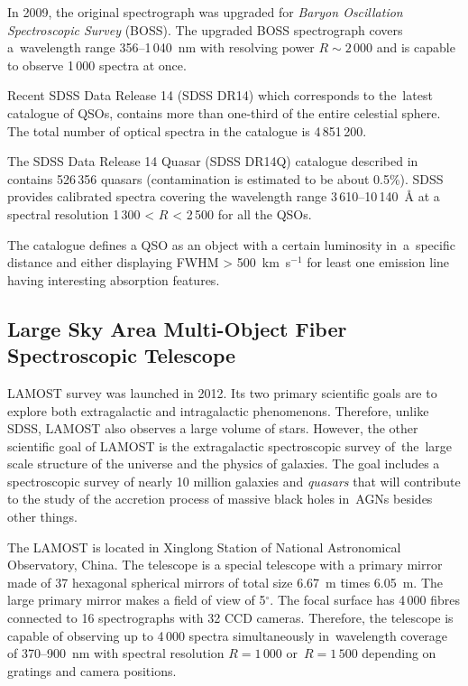 In 2009, the original spectrograph was upgraded for \textit{Baryon Oscillation Spectroscopic Survey} (BOSS).
The upgraded BOSS spectrograph covers a~wavelength range 356--1\,040~nm
with resolving power \(R \sim 2\,000\)
and is capable to observe 1\,000 spectra at once.~\cite{smee2013}

Recent SDSS Data Release 14 (SDSS DR14) which corresponds to the~latest catalogue of QSOs,
contains more than one-third of the entire celestial sphere.
The total number of optical spectra in the catalogue is 4\,851\,200.

The SDSS Data Release 14 Quasar (SDSS DR14Q) catalogue described in~\cite{paris2018} contains 526\,356 quasars
(contamination is estimated to be about 0.5\%).
SDSS provides calibrated spectra covering the wavelength range 3\,610--10\,140~\AA{} at a spectral resolution 1\,300 < \(R\) < 2\,500 for all the QSOs.

The catalogue defines a QSO as an object with a certain luminosity in~a~specific distance
and either displaying FWHM > 500~km~s\(^{-1}\) for least one emission line having interesting absorption features.

\subsection{Large Sky Area Multi-Object Fiber Spectroscopic Telescope}
\label{lamost}

LAMOST survey was launched in 2012.
Its two primary scientific goals are to explore both extragalactic and intragalactic phenomenons.
Therefore, unlike SDSS, LAMOST also observes a large volume of stars.
However, the other scientific goal of LAMOST is the extragalactic spectroscopic survey of~the~large scale structure of the universe and the physics of galaxies.
The goal includes a spectroscopic survey of nearly 10 million galaxies and \textit{quasars}
that will contribute to the study of the accretion process of massive black holes in~AGNs besides other things.~\cite{cui2012}

The LAMOST is located in Xinglong Station of National Astronomical Observatory, China.
The telescope is a special telescope with a primary mirror made of 37 hexagonal spherical mirrors of total size 6.67~m times 6.05~m.
The large primary mirror makes a field of view of 5\(^{\circ}\).
The focal surface has 4\,000 fibres connected to 16 spectrographs with 32 CCD cameras.
Therefore, the telescope is capable of observing up to 4\,000 spectra simultaneously
in~wavelength coverage of 370--900~nm with spectral resolution \(R = 1\,000\) or~\(R = 1\,500\) depending on gratings and camera positions.~\cite{cui2012}

